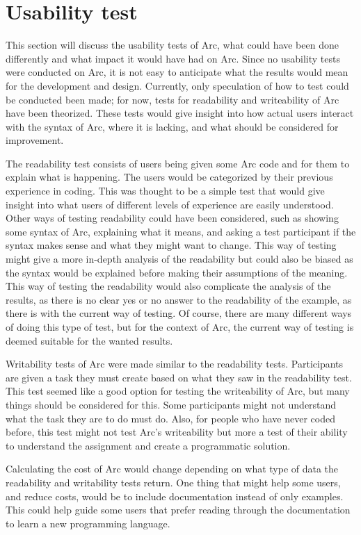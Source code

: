 \section{Usability test}\label{sec:discussion_usabilityTest}

This section will discuss the usability tests of Arc, what could have been done differently and what impact it would have had on Arc. Since no usability tests were conducted on Arc, it is not easy to anticipate what the results would mean for the development and design. Currently, only speculation of how to test could be conducted been made; for now, tests for readability and writeability of Arc have been theorized. These tests would give insight into how actual users interact with the syntax of Arc, where it is lacking, and what should be considered for improvement. 

The readability test consists of users being given some Arc code and for them to explain what is happening. The users would be categorized by their previous experience in coding. This was thought to be a simple test that would give insight into what users of different levels of experience are easily understood. Other ways of testing readability could have been considered, such as showing some syntax of Arc, explaining what it means, and asking a test participant if the syntax makes sense and what they might want to change. This way of testing might give a more in-depth analysis of the readability but could also be biased as the syntax would be explained before making their assumptions of the meaning. This way of testing the readability would also complicate the analysis of the results, as there is no clear yes or no answer to the readability of the example, as there is with the current way of testing. Of course, there are many different ways of doing this type of test, but for the context of Arc, the current way of testing is deemed suitable for the wanted results.

Writability tests of Arc were made similar to the readability tests. Participants are given a task they must create based on what they saw in the readability test. This test seemed like a good option for testing the writeability of Arc, but many things should be considered for this. Some participants might not understand what the task they are to do must do. Also, for people who have never coded before, this test might not test Arc's writeability but more a test of their ability to understand the assignment and create a programmatic solution. 

Calculating the cost of Arc would change depending on what type of data the readability and writability tests return. One thing that might help some users, and reduce costs, would be to include documentation instead of only examples. This could help guide some users that prefer reading through the documentation to learn a new programming language. 

